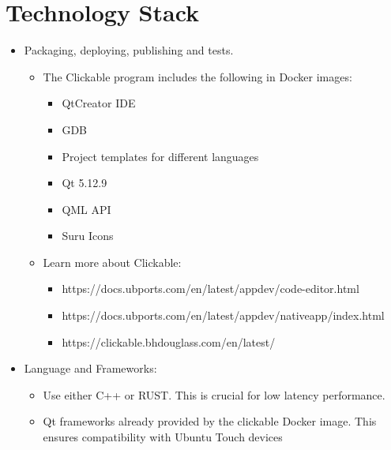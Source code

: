 \section{Technology Stack}



\begin{itemize}
	\item Packaging, deploying, publishing and tests.
	\begin{itemize}
		\item The Clickable program includes the following in Docker images:
		\begin{itemize}
			\item QtCreator IDE
			\item GDB
			\item Project templates for different languages
			\item Qt 5.12.9
			\item QML API
			\item Suru Icons
		\end{itemize}
		\item Learn more about Clickable:
		\begin{itemize}
			\item https://docs.ubports.com/en/latest/appdev/code-editor.html
			\item https://docs.ubports.com/en/latest/appdev/nativeapp/index.html
			\item https://clickable.bhdouglass.com/en/latest/
		\end{itemize} 
	\end{itemize}	
	\item Language and Frameworks:
	\begin{itemize}
		\item Use either C++ or RUST. This is crucial for low latency performance.
		\item Qt frameworks already provided by the clickable Docker image. This ensures compatibility with Ubuntu Touch devices
	\end{itemize}
\end{itemize}
